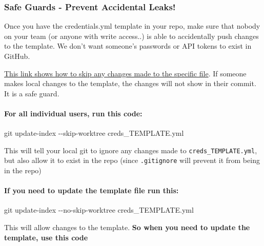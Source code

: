 \documentclass[
  letterpaper,
  DIV=11,
  numbers=noendperiod,
  oneside]{scrartcl}
\let\oldparagraph\paragraph
\renewcommand{\paragraph}[1]{\oldparagraph{#1}\mbox{}}
\newenvironment{Shaded}{\begin{snugshade}}{\end{snugshade}}
\newcommand{\AttributeTok}[1]{\textcolor[rgb]{0.40,0.45,0.13}{#1}}
\newcommand{\FunctionTok}[1]{\textcolor[rgb]{0.28,0.35,0.67}{#1}}
\newcommand{\NormalTok}[1]{\textcolor[rgb]{0.00,0.23,0.31}{#1}}
\begin{document}
\newpage{}

\subsubsection{Safe Guards - Prevent Accidental
Leaks!}\label{safe-guards---prevent-accidental-leaks}

Once you have the credentials.yml template in your repo, make sure that
nobody on your team (or anyone with write access..) is able to
accidentally push changes to the template. We don't want someone's
passwords or API tokens to exist in GitHub.

\href{https://stackoverflow.com/a/39776107}{This link shows how to skip
any changes made to the specific file}. If someone makes local changes
to the template, the changes will not show in their commit. It is a safe
guard.

\paragraph{For all individual users, run this
code:}\label{for-all-individual-users-run-this-code}

\begin{Shaded}
\begin{Highlighting}[]
\FunctionTok{git}\NormalTok{ update{-}index }\AttributeTok{{-}{-}skip{-}worktree}\NormalTok{ creds\_TEMPLATE.yml}
\end{Highlighting}
\end{Shaded}

This will tell your local git to ignore any changes made to
\texttt{creds\_TEMPLATE.yml}, but also allow it to exist in the repo
(since \texttt{.gitignore} will prevent it from being in the repo)

\paragraph{If you need to update the template file run
this:}\label{if-you-need-to-update-the-template-file-run-this}

\begin{Shaded}
\begin{Highlighting}[]
\FunctionTok{git}\NormalTok{ update{-}index }\AttributeTok{{-}{-}no{-}skip{-}worktree}\NormalTok{ creds\_TEMPLATE.yml}
\end{Highlighting}
\end{Shaded}

This will allow changes to the template. \textbf{So when you need to
update the template, use this code}
\end{document}
